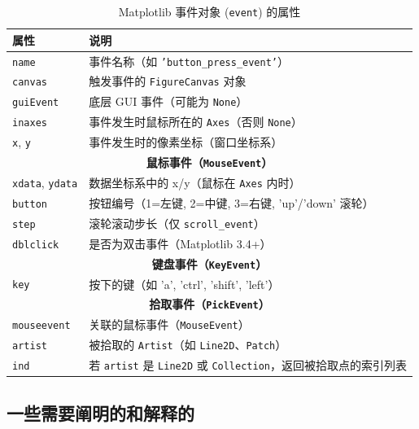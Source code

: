 \documentclass[12pt]{article}
\begin{document}
\begin{table}[H]
    \centering
    \begin{tabular}{ll}
        \toprule
        \textbf{属性} & \textbf{说明} \\
        \midrule
        \texttt{name} & 事件名称（如 \texttt{'button\_press\_event'}） \\
        \texttt{canvas} & 触发事件的 \texttt{FigureCanvas} 对象 \\
        \texttt{guiEvent} & 底层 GUI 事件（可能为 \texttt{None}） \\
        \texttt{inaxes} & 事件发生时鼠标所在的 \texttt{Axes}（否则 \texttt{None}） \\
        \texttt{x}, \texttt{y} & 事件发生时的像素坐标（窗口坐标系） \\
        \midrule
        \multicolumn{2}{c}{\textbf{鼠标事件（\texttt{MouseEvent}）}} \\
        \midrule
        \texttt{xdata}, \texttt{ydata} & 数据坐标系中的 x/y（鼠标在 \texttt{Axes} 内时） \\
        \texttt{button} & 按钮编号（1=左键, 2=中键, 3=右键, 'up'/'down' 滚轮） \\
        \texttt{step} & 滚轮滚动步长（仅 \texttt{scroll\_event}） \\
        \texttt{dblclick} & 是否为双击事件（Matplotlib 3.4+） \\
        \midrule
        \multicolumn{2}{c}{\textbf{键盘事件（\texttt{KeyEvent}）}} \\
        \midrule
        \texttt{key} & 按下的键（如 'a', 'ctrl', 'shift', 'left'） \\
        \midrule
        \multicolumn{2}{c}{\textbf{拾取事件（\texttt{PickEvent}）}} \\
        \midrule
        \texttt{mouseevent} & 关联的鼠标事件（\texttt{MouseEvent}） \\
        \texttt{artist} & 被拾取的 \texttt{Artist}（如 \texttt{Line2D}、\texttt{Patch}） \\
        \texttt{ind} & 若 \texttt{artist} 是 \texttt{Line2D} 或 \texttt{Collection}，返回被拾取点的索引列表 \\
        \bottomrule
    \end{tabular}
    \caption{Matplotlib 事件对象 (\texttt{event}) 的属性}
    \label{tab:matplotlib_event_properties}
\end{table}

\subsection{一些需要阐明的和解释的}
\end{document}
